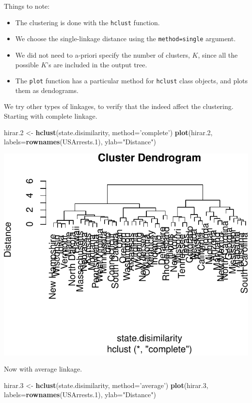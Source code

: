\documentclass[]{book}
\newenvironment{Shaded}{\begin{snugshade}}{\end{snugshade}}
\newcommand{\DataTypeTok}[1]{\textcolor[rgb]{0.13,0.29,0.53}{#1}}
\newcommand{\FloatTok}[1]{\textcolor[rgb]{0.00,0.00,0.81}{#1}}
\newcommand{\KeywordTok}[1]{\textcolor[rgb]{0.13,0.29,0.53}{\textbf{#1}}}
\newcommand{\NormalTok}[1]{#1}
\newcommand{\StringTok}[1]{\textcolor[rgb]{0.31,0.60,0.02}{#1}}
\providecommand{\tightlist}{%
  \setlength{\itemsep}{0pt}\setlength{\parskip}{0pt}}
\theoremstyle{definition}
\theoremstyle{definition}
\theoremstyle{definition}
\theoremstyle{remark}
\begin{document}
Things to note:

\begin{itemize}
\tightlist
\item
  The clustering is done with the \texttt{hclust} function.
\item
  We choose the single-linkage distance using the \texttt{method=\textquotesingle{}single\textquotesingle{}} argument.
\item
  We did not need to a-priori specify the number of clusters, \(K\), since all the possible \(K\)'s are included in the output tree.
\item
  The \texttt{plot} function has a particular method for \texttt{hclust} class objects, and plots them as dendograms.
\end{itemize}

We try other types of linkages, to verify that the indeed affect the clustering.
Starting with complete linkage.

\begin{Shaded}
\begin{Highlighting}[]
\NormalTok{hirar}\FloatTok{.2}\NormalTok{ <-}\StringTok{ }\KeywordTok{hclust}\NormalTok{(state.disimilarity, }\DataTypeTok{method=}\StringTok{'complete'}\NormalTok{)}
\KeywordTok{plot}\NormalTok{(hirar}\FloatTok{.2}\NormalTok{, }\DataTypeTok{labels=}\KeywordTok{rownames}\NormalTok{(USArrests}\FloatTok{.1}\NormalTok{), }\DataTypeTok{ylab=}\StringTok{"Distance"}\NormalTok{)}
\end{Highlighting}
\end{Shaded}

\includegraphics[width=0.5\linewidth]{Rcourse_files/figure-latex/complete linkage-1}

Now with average linkage.

\begin{Shaded}
\begin{Highlighting}[]
\NormalTok{hirar}\FloatTok{.3}\NormalTok{ <-}\StringTok{ }\KeywordTok{hclust}\NormalTok{(state.disimilarity, }\DataTypeTok{method=}\StringTok{'average'}\NormalTok{)}
\KeywordTok{plot}\NormalTok{(hirar}\FloatTok{.3}\NormalTok{, }\DataTypeTok{labels=}\KeywordTok{rownames}\NormalTok{(USArrests}\FloatTok{.1}\NormalTok{), }\DataTypeTok{ylab=}\StringTok{"Distance"}\NormalTok{)}
\end{Highlighting}
\end{Shaded}
\end{document}
